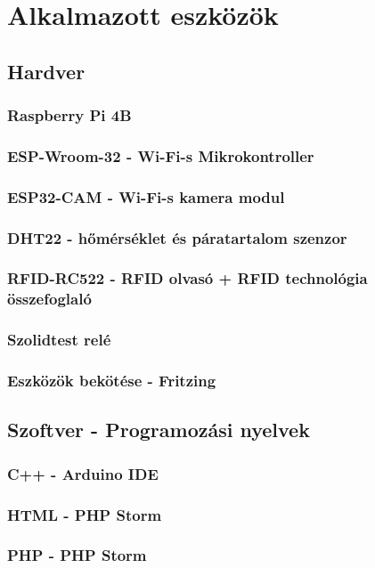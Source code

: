 \documentclass[
]{thesis-ekf}
\theoremstyle{definition}
\theoremstyle{remark}
\begin{document}
	\chapter{Alkalmazott eszközök}
	\section{Hardver}
	\subsection{Raspberry Pi 4B}
	\subsection{ESP-Wroom-32 - Wi-Fi-s Mikrokontroller}
	\subsection{ESP32-CAM - Wi-Fi-s kamera modul}
	\subsection{DHT22 - hőmérséklet és páratartalom szenzor}
	\subsection{RFID-RC522 - RFID olvasó + RFID technológia összefoglaló}
	\subsection{Szolidtest relé}
	\subsection{Eszközök bekötése - Fritzing}
	
	\section{Szoftver - Programozási nyelvek}
	\subsection{C++ - Arduino IDE}
	\subsection{HTML - PHP Storm}
	\subsection{PHP - PHP Storm}
\end{document}
